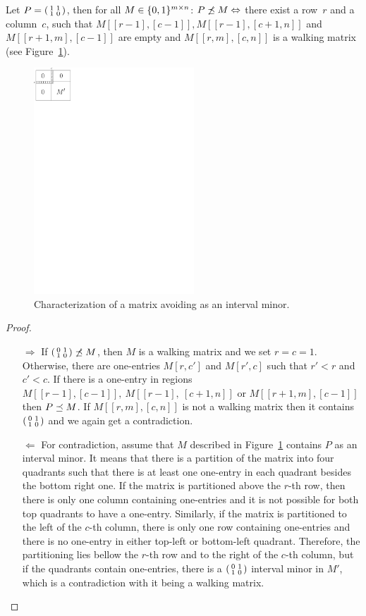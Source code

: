 \begin{thm}
\label{theorem1}
Let $P=\left(\begin{smallmatrix}1&1\\1&0\end{smallmatrix}\right)$, then for all $M\in\{0,1\}^{m\times n}$: $P\not\preceq M\Leftrightarrow$ there exist a row~$r$ and a column~$c$, such that $M[[r-1],[c-1]],M[[r-1],[c+1,n]]$ and $M[[r+1,m],[c-1]]$ are empty and $M[[r,m],[c,n]]$ is a walking matrix (see Figure~\ref{p12}). %
\end{thm}
\begin{figure}[h!]
\centering
\includegraphics[width=60mm]{img/p12.pdf}
\caption{Characterization of a matrix avoiding \usebox{\smlmat} as an interval minor.}
\label{p12}
\end{figure}
\begin{proof}
\begin{itemize}
\item[$\Rightarrow$] If $\left(\begin{smallmatrix}0&1\\1&0\end{smallmatrix}\right)\not\preceq M$, then $M$ is a walking matrix and we set $r=c=1$. Otherwise, there are one-entries $M[r,c']$ and $M[r',c]$ such that $r'<r$ and $c'<c$. If there is a one-entry in regions $M[[r-1],[c-1]],\ M[[r-1],\ [c+1,n]]$ or $M[[r+1,m],[c-1]]$ then $P\preceq M$. If $M[[r,m],[c,n]]$ is not a walking matrix then it contains $\left(\begin{smallmatrix}0&1\\1&0\end{smallmatrix}\right)$ and we again get a contradiction.
\item[$\Leftarrow$] For contradiction, assume that $M$ described in Figure~\ref{p12} contains $P$ as an interval minor. It means that there is a partition of the matrix into four quadrants such that there is at least one one-entry in each quadrant besides the bottom right one. If the matrix is partitioned above the $r$-th row, then there is only one column containing one-entries and it is not possible for both top quadrants to have a one-entry. Similarly, if the matrix is partitioned to the left of the $c$-th column, there is only one row containing one-entries and there is no one-entry in either top-left or bottom-left quadrant. Therefore, the partitioning lies bellow the $r$-th row and to the right of the $c$-th column, but if the quadrants contain one-entries, there is a $\left(\begin{smallmatrix}0&1\\1&0\end{smallmatrix}\right)$ interval minor in $M'$, which is a contradiction with it being a walking matrix. %
\end{itemize}
\end{proof}


